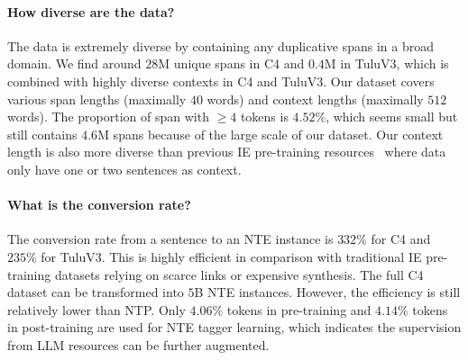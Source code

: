 \paragraph{How diverse are the data?} The data is extremely diverse by containing any duplicative spans in a broad domain. We find around $28$M unique spans in C4 and $0.4$M in TuluV3, which is combined with highly diverse contexts in C4 and TuluV3. Our dataset covers various span lengths (maximally $40$ words) and context lengths (maximally $512$ words). The proportion of span with $\geq 4$ tokens is $4.52\%$, which seems small but still contains $4.6$M spans because of the large scale of our dataset. Our context length is also more diverse than previous IE pre-training resources~\citep{multinerd,NuNER,metaie} where data only have one or two sentences as context.

\paragraph{What is the conversion rate?} The conversion rate from a sentence to an NTE instance is $332\%$ for C4 and $235\%$ for TuluV3. This is highly efficient in comparison with traditional IE pre-training datasets relying on scarce links or expensive synthesis. The full C4 dataset can be transformed into $5$B NTE instances. However, the efficiency is still relatively lower than NTP. Only $4.06\%$ tokens in pre-training and $4.14\%$ tokens in post-training are used for NTE tagger learning, which indicates the supervision from LLM resources can be further augmented.